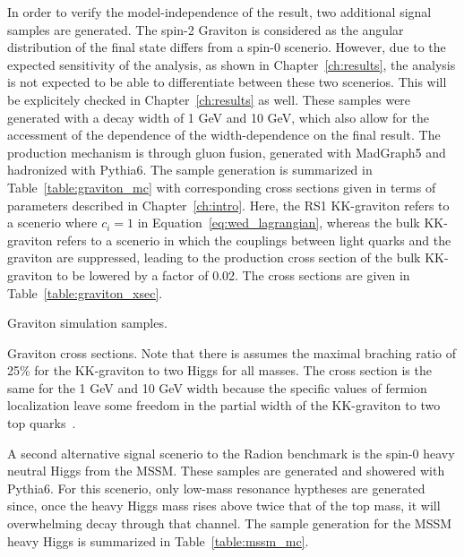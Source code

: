 In order to verify the model-independence of the result, two additional signal samples are generated.
The spin-2 Graviton is considered as the angular distribution of the final state differs from a
spin-0 scenerio. However, due to the expected sensitivity of the analysis, as shown in
Chapter~\ref{ch:results}, the analysis is not expected to be able to differentiate between
these two scenerios. This will be explicitely checked in Chapter~\ref{ch:results} as well.
These samples were generated with a decay width of 1 GeV and 10 GeV,
which also allow for the accessment of the
dependence of the width-dependence on the final result. The production mechanism is through
gluon fusion, generated with MadGraph5 and hadronized with Pythia6. The sample generation
is summarized in Table~\ref{table:graviton_mc} with corresponding cross sections given in terms of
parameters described in Chapter~\ref{ch:intro}. Here, the RS1 KK-graviton refers to a scenerio
where $c_i = 1$ in Equation~\ref{eq:wed_lagrangian}, whereas the bulk KK-graviton refers to a scenerio
in which the couplings between light quarks and the graviton are suppressed, leading to the
production cross section of the bulk KK-graviton to be lowered by a factor of 0.02. The cross sections
are given in Table~\ref{table:graviton_xsec}.

\begin{table}[ht]
  \centering
  \renewcommand{\arraystretch}{1.4}
  \caption{Graviton simulation samples.}
  
  \label{table:graviton_mc}
\end{table}

\begin{table}[ht]
  \centering
  \renewcommand{\arraystretch}{1.4}
  \caption{Graviton cross sections. Note that there is assumes the maximal
braching ratio of 25\% for the KK-graviton to two Higgs for all masses. The cross section is the
same for the 1 GeV and 10 GeV width because the specific values of fermion localization leave some
freedom in the partial width of the KK-graviton to two top quarks~\cite{Agashe:2007zd}.}
  
  \label{table:graviton_xsec}
\end{table}

A second alternative signal scenerio to the Radion benchmark is the spin-0 heavy neutral Higgs from
the MSSM. These samples are generated and showered with Pythia6. For this scenerio, only low-mass
resonance hyptheses are generated since, once the heavy Higgs mass rises above twice that of the top
mass, it will overwhelming decay through that channel. The sample generation for the MSSM heavy
Higgs is summarized in Table~\ref{table:mssm_mc}.

